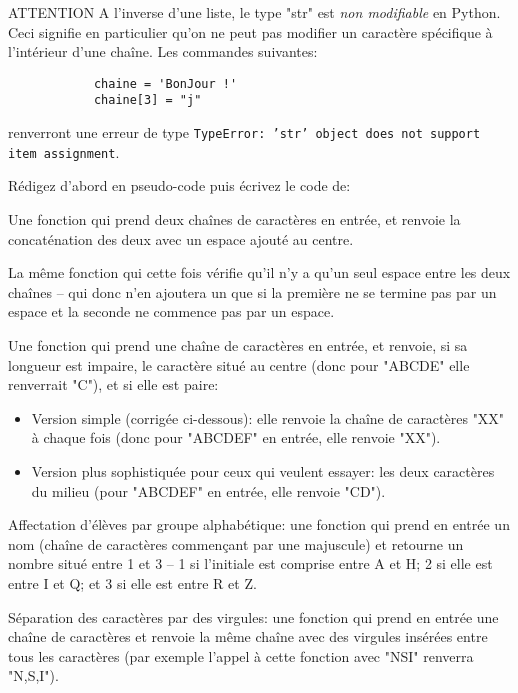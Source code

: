 \documentclass[12pt]{article}
\begin{document}
	\begin{MonAmp}{ATTENTION}
		A l'inverse d'une liste, le type "str" est \textit{non modifiable} en Python. Ceci signifie en particulier qu'on ne peut pas modifier un caractère spécifique à l'intérieur d'une chaîne. Les commandes suivantes:
		\begin{verbatim}
			chaine = 'BonJour !'
			chaine[3] = "j"
		\end{verbatim}
		renverront une erreur de type \texttt{TypeError: 'str' object does not support item assignment}.
	\end{MonAmp}
	
	\begin{MonExo}
		Rédigez d'abord en pseudo-code puis écrivez le code de:
		\begin{alphenum}
			\item Une fonction qui prend deux chaînes de caractères en entrée, et renvoie la concaténation des deux avec un espace ajouté au centre.
			\item La même fonction qui cette fois vérifie qu'il n'y a qu'un seul espace entre les deux chaînes -- qui donc n'en ajoutera un que si la première ne se termine pas par un espace et la seconde ne commence pas par un espace.
			\item Une fonction qui prend une chaîne de caractères en entrée, et renvoie, si sa longueur est impaire, le caractère situé au centre (donc pour "ABCDE" elle renverrait "C"), et si elle est paire:
			\begin{itemize}
				\item Version simple (corrigée ci-dessous): elle renvoie la chaîne de caractères "XX" à chaque fois (donc pour "ABCDEF" en entrée, elle renvoie "XX").
				\item Version plus sophistiquée pour ceux qui veulent essayer: les deux caractères du milieu (pour "ABCDEF" en entrée, elle renvoie "CD").
			\end{itemize} 
			\item Affectation d'élèves par groupe alphabétique: une fonction qui prend en entrée un nom (chaîne de caractères commençant par une majuscule) et retourne un nombre situé entre 1 et 3 -- 1 si l'initiale est comprise entre A et H; 2 si elle est entre I et Q; et 3 si elle est entre R et Z.
			\item Séparation des caractères par des virgules: une fonction qui prend en entrée une chaîne de caractères et renvoie la même chaîne avec des virgules insérées entre tous les caractères (par exemple l'appel à cette fonction avec "NSI" renverra "N,S,I").
		\end{alphenum}
	\end{MonExo}
\end{document}
